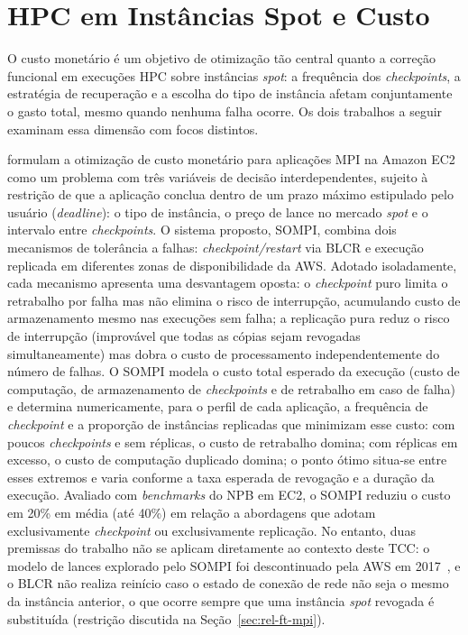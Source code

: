 \section{HPC em Instâncias Spot e Custo}
\label{sec:rel-spot-hpc}

O custo monetário é um objetivo de otimização tão central quanto a correção
funcional em execuções HPC sobre instâncias \textit{spot}: a frequência dos
\textit{checkpoints}, a estratégia de recuperação e a escolha do tipo de
instância afetam conjuntamente o gasto total, mesmo quando nenhuma falha
ocorre. Os dois trabalhos a seguir examinam essa dimensão com focos distintos.

 formulam a otimização de custo monetário para
aplicações MPI na Amazon EC2 como um problema com três variáveis de decisão
interdependentes, sujeito à restrição de que a aplicação conclua dentro de um
prazo máximo estipulado pelo usuário (\textit{deadline}): o tipo de instância,
o preço de lance no mercado \textit{spot} e o intervalo entre
\textit{checkpoints}. O sistema proposto, SOMPI, combina dois mecanismos de
tolerância a falhas: \textit{checkpoint/restart} via BLCR e execução replicada
em diferentes zonas de disponibilidade da AWS. Adotado isoladamente, cada
mecanismo apresenta uma desvantagem oposta: o \textit{checkpoint} puro limita
o retrabalho por falha mas não elimina o risco de interrupção, acumulando
custo de armazenamento mesmo nas execuções sem falha; a replicação pura
reduz o risco de interrupção (improvável que todas as cópias sejam revogadas
simultaneamente) mas dobra o custo de processamento independentemente do
número de falhas. O SOMPI modela o
custo total esperado da execução (custo de computação, de armazenamento de
\textit{checkpoints} e de retrabalho em caso de falha) e determina
numericamente, para o perfil de cada aplicação, a frequência de
\textit{checkpoint} e a proporção de instâncias replicadas que minimizam esse
custo: com poucos \textit{checkpoints} e sem réplicas, o custo de retrabalho
domina; com réplicas em excesso, o custo de computação duplicado domina; o
ponto ótimo situa-se entre esses extremos e varia conforme a taxa esperada de
revogação e a duração da execução. Avaliado com \textit{benchmarks} do NPB em EC2, o
SOMPI reduziu o custo em 20\% em média (até 40\%) em relação a abordagens que
adotam exclusivamente \textit{checkpoint} ou exclusivamente replicação. No
entanto, duas premissas do trabalho não se aplicam diretamente ao contexto
deste TCC: o modelo de lances explorado pelo SOMPI foi descontinuado pela AWS
em 2017~\cite{aws2018spot}, e o BLCR não realiza reinício caso o estado de
conexão de rede não seja o mesmo da instância anterior, o que ocorre sempre
que uma instância \textit{spot} revogada é substituída (restrição discutida na
Seção~\ref{sec:rel-ft-mpi}).

